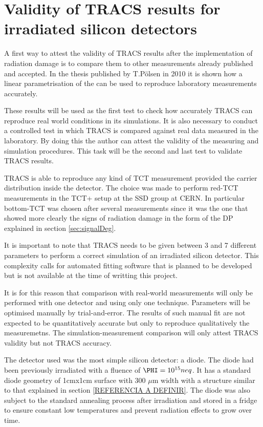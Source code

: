 \chapter{Validity of TRACS results for irradiated silicon detectors}
\label{sec:TRACSvalidity}

A first way to attest the validity of TRACS results after the implementation of radiation damage is to compare them to other measurements already published and accepted. In the thesis published by T.P\"{o}lsen in 2010\cite{Pholsen} it is shown how a linear parametrisation of the \neff can be used to reproduce laboratory measurements accurately. 

These results will be used as the first test to check how accurately TRACS can reproduce real world conditions in its simulations. It is also necessary to conduct a controlled test in which TRACS is compared against real data measured in the laboratory. By doing this the author can attest the validity of the measuring and simulation procedures. This task will be the second and last test to validate TRACS results.

TRACS is able to reproduce any kind of TCT measurement provided the carrier distribution inside the detector. The choice was made to perform red-TCT measurements in the TCT+ setup at the SSD group at CERN. In particular bottom-TCT was chosen after several measurements since it was the one that showed more clearly the signs of radiation damage in the form of the DP explained in section \ref{sec:signalDeg}. 

It is important to note that TRACS needs to be given between 3 and 7 different parameters to perform a correct simulation of an irradiated silicon detector. This complexity calls for automated fitting software that is planned to be developed but is not available at the time of writting this project.

It is for this reason that comparison with real-world measurements will only be performed with one detector and using only one technique. Parameters will be optimised manually by trial-and-error. The results of such manual fit are not expected to be quantitatively accurate but only to reproduce qualitatively the measuremetns. The simulation-measurement comparison will only attest TRACS validity but not TRACS accuracy.

The detector used was the most simple silicon detector: a diode. The diode had been previously irradiated with a fluence of $\PHI = 10^{15} neq$. It has a standard diode geometry of 1cmx1cm surface with 300 $\mu$m width with a structure similar to that explained in section \ref{REFERENCIA A DEFINIR}. The diode was also subject to the standard annealing process after irradiation and stored in a fridge to ensure constant low temperatures and prevent radiation effects to grow over time. 


